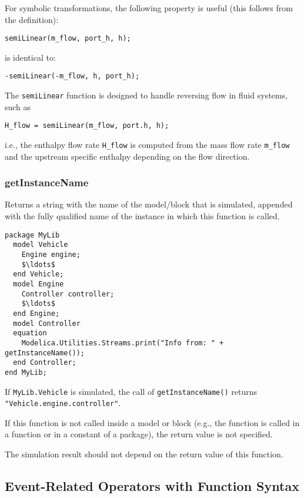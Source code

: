 \begin{nonnormative}
For symbolic transformations, the following property is useful (this follows from the definition):
\begin{lstlisting}[language=modelica]
semiLinear(m_flow, port_h, h);
\end{lstlisting}
is identical to:
\begin{lstlisting}[language=modelica]
-semiLinear(-m_flow, h, port_h);
\end{lstlisting}

The \lstinline!semiLinear! function is designed to handle reversing flow in fluid systems, such as
\begin{lstlisting}[language=modelica]
H_flow = semiLinear(m_flow, port.h, h);
\end{lstlisting}
i.e., the enthalpy flow rate \lstinline!H_flow! is computed from the mass flow rate \lstinline!m_flow! and the upstream specific enthalpy depending on the flow direction.
\end{nonnormative}

\subsubsection{getInstanceName}\label{getinstancename}

Returns a string with the name of the model/block that is simulated, appended with the fully qualified name of the instance in which this function is called.

\begin{example}
\begin{lstlisting}[language=modelica]
package MyLib
  model Vehicle
    Engine engine;
    $\ldots$
  end Vehicle;
  model Engine
    Controller controller;
    $\ldots$
  end Engine;
  model Controller
  equation
    Modelica.Utilities.Streams.print("Info from: " + getInstanceName());
  end Controller;
end MyLib;
\end{lstlisting}
If \lstinline!MyLib.Vehicle! is simulated, the call of \lstinline!getInstanceName()! returns \lstinline!"Vehicle.engine.controller"!.
\end{example}

If this function is not called inside a model or block (e.g., the function is called in a function or in a constant of a package), the return value is not specified.

The simulation result should not depend on the return value of this function.

\subsection{Event-Related Operators with Function Syntax}\label{event-related-operators-with-function-syntax}

